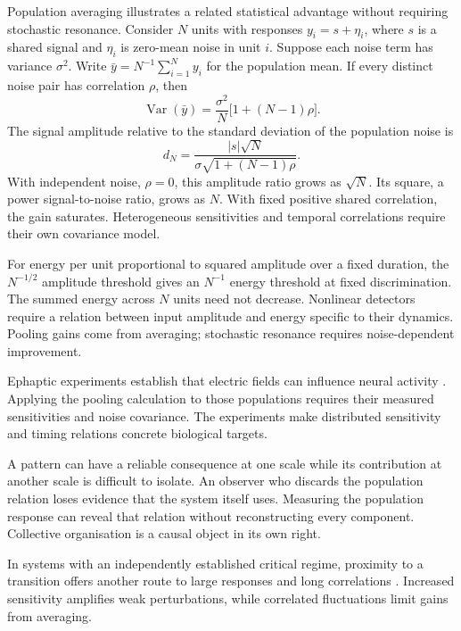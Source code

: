 \documentclass[10pt,twocolumn]{article}
\begin{document}
Population averaging illustrates a related statistical advantage without requiring stochastic resonance. Consider \(N\) units with responses \(y_i=s+\eta_i\), where \(s\) is a shared signal and \(\eta_i\) is zero-mean noise in unit \(i\). Suppose each noise term has variance \(\sigma^2\). Write \(\bar y=N^{-1}\sum_{i=1}^{N}y_i\) for the population mean. If every distinct noise pair has correlation \(\rho\), then
\begin{equation}
\operatorname{Var}(\bar y)
=\frac{\sigma^2}{N}\bigl[1+(N-1)\rho\bigr].
\label{eq:pooling}
\end{equation}
The signal amplitude relative to the standard deviation of the population noise is
\begin{equation}
d_N=\frac{|s|\sqrt N}
{\sigma\sqrt{1+(N-1)\rho}}.
\label{eq:snr}
\end{equation}
With independent noise, \(\rho=0\), this amplitude ratio grows as \(\sqrt N\). Its square, a power signal-to-noise ratio, grows as \(N\). With fixed positive shared correlation, the gain saturates. Heterogeneous sensitivities and temporal correlations require their own covariance model.

For energy per unit proportional to squared amplitude over a fixed duration, the \(N^{-1/2}\) amplitude threshold gives an \(N^{-1}\) energy threshold at fixed discrimination. The summed energy across \(N\) units need not decrease. Nonlinear detectors require a relation between input amplitude and energy specific to their dynamics. Pooling gains come from averaging; stochastic resonance requires noise-dependent improvement.

Ephaptic experiments establish that electric fields can influence neural activity \citep{anastassiou2011,chiang2019}. Applying the pooling calculation to those populations requires their measured sensitivities and noise covariance. The experiments make distributed sensitivity and timing relations concrete biological targets.

A pattern can have a reliable consequence at one scale while its contribution at another scale is difficult to isolate. An observer who discards the population relation loses evidence that the system itself uses. Measuring the population response can reveal that relation without reconstructing every component. Collective organisation is a causal object in its own right.

In systems with an independently established critical regime, proximity to a transition offers another route to large responses and long correlations \citep{munoz2018}. Increased sensitivity amplifies weak perturbations, while correlated fluctuations limit gains from averaging.
\end{document}
